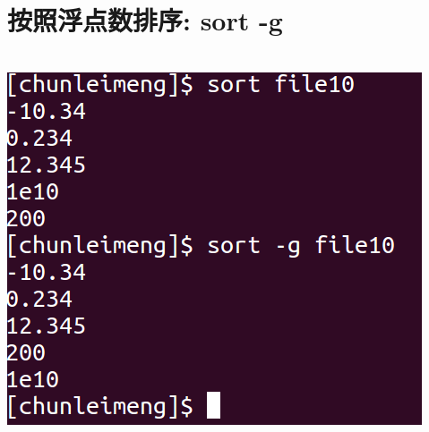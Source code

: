 \documentclass{article}
\begin{document}
\section{按照浮点数排序: sort -g}
~\\
\includegraphics[scale=0.5]{pic9.png} \par
\end{document}
